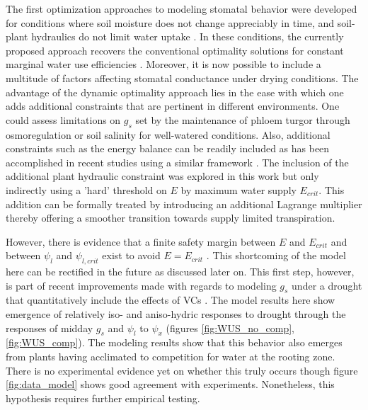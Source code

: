 \documentclass[utf8]{frontiersSCNS} %
\begin{document}
The first optimization approaches to modeling stomatal behavior were developed for conditions where soil moisture does not change appreciably in time, and soil-plant hydraulics do not limit water uptake \citep{cowan_stomatal_1977}. In these conditions,  the currently proposed approach recovers the conventional optimality solutions for constant marginal water use efficiencies  \citep{katul_stomatal_2009}. Moreover, it is now possible to include a multitude of factors affecting stomatal conductance under drying conditions. The advantage of the dynamic optimality approach lies in the ease with which one adds additional constraints that are pertinent in different environments. One could assess limitations on $g_s$ set by the maintenance of phloem turgor through osmoregulation \citep{sevanto_how_2014} or soil salinity for well-watered conditions. Also, additional constraints such as the energy balance can be readily included as has been accomplished in recent studies using a similar framework \citep{roth2018fossil}.  The inclusion of the additional plant hydraulic constraint was explored in this work but only indirectly using a 'hard' threshold on $E$ by maximum water supply $E_{crit}$. This addition can be formally treated by introducing an additional Lagrange multiplier thereby offering a smoother transition towards supply limited transpiration.

However, there is evidence that a finite safety margin between $E$ and $E_{crit}$ and between $\psi_l$ and $\psi_{l, crit}$ exist to avoid $E = E_{crit}$ \citep{mcdowell_mechanisms_2008, plaut_hydraulic_2012}. This shortcoming of the model here can be rectified in the future as discussed later on. This first step, however, is part of recent improvements made with regards to modeling $g_s$ under a drought that quantitatively include the effects of VCs \citep{sperry_what_2015, sperry_predicting_2017}. The model results here show emergence of relatively iso- and aniso-hydric responses to drought through the responses of midday $g_s$ and $\psi_l$ to $\psi_x$ (figures \ref{fig:WUS_no_comp}, \ref{fig:WUS_comp}). The modeling results show that this behavior also emerges from plants having acclimated to competition for water at the rooting zone. There is no experimental evidence yet on whether this truly occurs though figure \ref{fig:data_model} shows good agreement with experiments. Nonetheless, this hypothesis requires further empirical testing.
\end{document}

